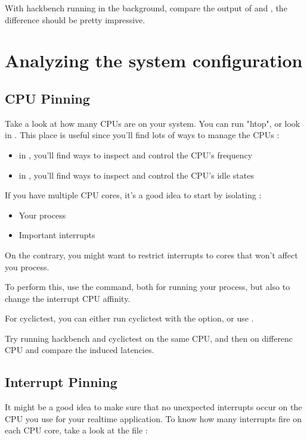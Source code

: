 With hackbench running in the background, compare the output of  and , the
difference should be pretty impressive.

\section{Analyzing the system configuration}

\subsection{CPU Pinning}

Take a look at how many CPUs are on your system. You can run "htop", or
look in . This place is useful since you'll find
lots of ways to manage the CPUs :

\begin{itemize}
	\item in , you'll find ways to inspect and control the CPU's frequency
	\item in , you'll find ways to inspect and control the CPU's idle states
\end{itemize}

If you have multiple CPU cores, it's a good idea to start by isolating :
\begin{itemize}
	\item Your process
	\item Important interrupts
\end{itemize}

On the contrary, you might want to restrict interrupts to cores that won't affect
you process.

To perform this, use the  command, both for running your process, but
also to change the interrupt CPU affinity.

For cyclictest, you can either run cyclictest with the  option,
or use .

Try running hackbench and cyclictest on the same CPU, and then on differenc CPU and
compare the induced latencies.

\subsection{Interrupt Pinning}

It might be a good idea to make sure that no unexpected interrupts occur on the CPU
you use for your realtime application. To know how many interrupts fire on each CPU
core, take a look at the  file :

